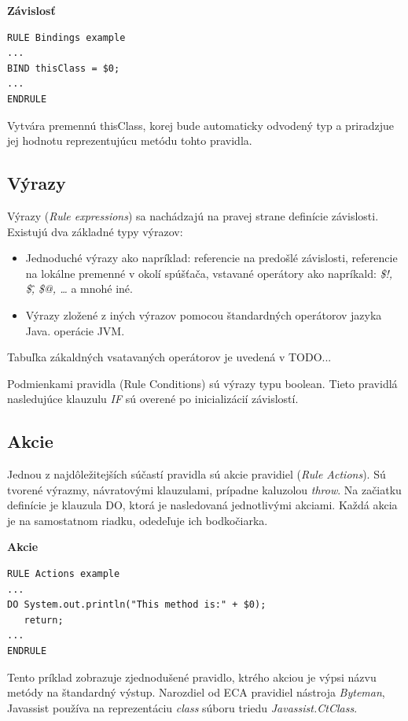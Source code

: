 \documentclass[11pt,final,oneside]{fithesis}
\newenvironment{example}[1]
{
\vspace{3mm}
\noindent\textbf{#1}
\vspace{2mm}
}
{
\vspace{3mm}
}
\begin{document}
\begin{example}{Závislosť}
\begin{verbatim}
RULE Bindings example
...
BIND thisClass = $0;
...
ENDRULE
\end{verbatim}
\end{example}

Vytvára premennú thisClass, korej bude automaticky odvodený typ a priradzjue jej hodnotu reprezentujúcu metódu tohto pravidla.

\subsection{Výrazy}
Výrazy (\textit{Rule expressions}) sa nachádzajú na pravej strane definície závislosti. Existujú dva základné typy výrazov:
\begin{itemize}
\item Jednoduché výrazy ako napríklad: referencie na predošlé závislosti, referencie na lokálne premenné v okolí spúšťača, vstavané operátory ako napríkald: \textit{\$!, \$\^, \$@, …} a mnohé iné.
\item Výrazy zložené z iných výrazov pomocou štandardných operátorov jazyka Java.
operácie JVM.
\end{itemize}
Tabuľka zákaldných vsatavaných operátorov je uvedená v TODO...

Podmienkami pravidla (Rule Conditions) sú výrazy typu boolean. Tieto pravidlá nasledujúce klauzulu \textit{IF} sú overené po inicializácií závislostí.

\subsection{Akcie}

Jednou z najdôležitejších súčastí pravidla sú akcie pravidiel (\textit{Rule Actions}). Sú tvorené výrazmy, návratovými klauzulami, prípadne kaluzolou
\textit{throw}. Na začiatku definície je klauzula DO, ktorá je nasledovaná jednotlivými akciami. Každá akcia je na samostatnom riadku, odedeľuje ich bodkočiarka.

\begin{example}{Akcie}
\begin{verbatim}
RULE Actions example
...
DO System.out.println("This method is:" + $0);
   return;
...
ENDRULE
\end{verbatim}
\end{example}

Tento príklad zobrazuje zjednodušené pravidlo, ktrého akciou je výpsi názvu metódy na štandardný výstup. Narozdiel od ECA pravidiel nástroja
\textit{Byteman}, Javassist používa na reprezentáciu \textit{class} súboru triedu \textit{Javassist.CtClass}.
\end{document}
